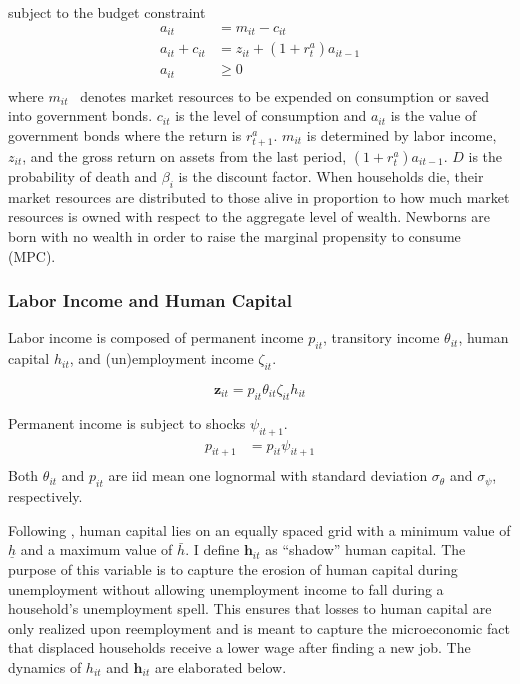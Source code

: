 subject to the budget constraint 
\begin{align*}
a_{it}     &= m_{it} - c_{it}    \\
a_{it} +c_{it}    &= z_{it} +   (1 + r^{a}_{t} ) a_{it-1} \\ 
a_{it}  &\geq 0 \\
\end{align*}
where $m_{it}$ \ denotes market resources to be expended on consumption or saved into government bonds. $c_{it}$ is the level of consumption and $ a_{it}$ is the value of government bonds where the return is $r_{t+1}^{a}$.  $m_{it}$ is determined by labor income,  $z_{it}$, and the gross return on assets from the last period, $(1+r_{t}^{a}) a_{it-1} $. $D$ is the probability of death and $\beta_{i}$ is the discount factor. When households die, their market resources are distributed to those alive in proportion to how much market resources is owned with respect to the aggregate level of wealth. Newborns are born with no wealth in order to raise the marginal propensity to consume (MPC).  



\subsubsection{Labor Income and Human Capital}
\label{subsec:Labor Income and Human Capital}
Labor income is composed of permanent income $p_{it}$, transitory income $\theta_{it}$, human capital $h_{it}$, and (un)employment income $\zeta_{it}$.


$$\mathbf{z}_{it} = p_{it}\theta_{it}\zeta_{it} h_{it}$$ 

Permanent income is subject to shocks $\psi_{it+1}$.
\begin{align*}
p_{it+1} &=p_{it} \psi_{it+1} \\
\end{align*}
Both $\theta_{it}$ and $p_{it}$  are iid mean one lognormal with standard deviation $\sigma_{\theta}$ and $\sigma_\psi$, respectively.


Following \cite{Birinci2021}, human capital lies on an equally spaced grid with a minimum value of $\underline{h}$ and a maximum value of $\bar{h}$. I define $\mathbf{h}_{it}$ as ``shadow'' human capital. The purpose of this variable is to capture the erosion of human capital during unemployment without allowing unemployment income to fall during a household's unemployment spell. This ensures that losses to human capital are only realized upon reemployment and is meant to capture the microeconomic fact that displaced households receive a lower wage after finding a new job. The dynamics of $h_{it}$ and $\mathbf{h}_{it}$ are elaborated below.
    

